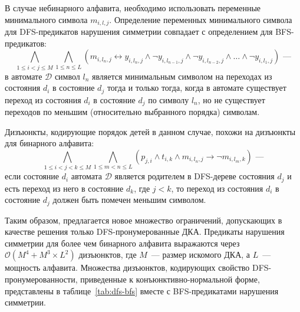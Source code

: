 В случае небинарного алфавита, необходимо использовать переменные минимального символа $m_{i,l,j}$.
Определение переменных минимального символа для DFS-предикатов нарушения симметрии совпадает с определением для BFS-предикатов:
\begin{equation*}
  \bigwedge_{1 \leq i < j \leq M} \bigwedge_{1 \leq n \leq L} \left(m_{i,l_{n},j} \leftrightarrow y_{i,l_{n},j} \wedge \neg y_{i,l_{n - 1}, j} \wedge \neg y_{i,l_{n - 2}, j} \wedge \ldots \wedge \neg y_{i,l_{1},j} \right)\text{~---}
\end{equation*}
в автомате $\mathcal{D}$ символ $l_{n}$ является минимальным символом на переходах из состояния $d_{i}$ в состояние $d_{j}$ тогда и только тогда, когда в автомате существует переход из состояния $d_{i}$ в состояние $d_{j}$ по символу $l_{n}$, но не существует переходов по меньшим (относительно выбранного порядка) символам.

Дизъюнкты, кодирующие порядок детей в данном случае, похожи на дизъюнкты для бинарного алфавита:
\begin{equation*}
  \bigwedge\limits_{1 \leq i < j < k \leq M} \bigwedge_{1 \leq m < n \leq L} \left(p_{j,i} \wedge t_{i,k} \wedge m_{i,l_n,j} \rightarrow \neg m_{i,l_m,k}\right)\text{~---}
\end{equation*}
если состояние $d_{i}$ автомата $\mathcal{D}$ является родителем в DFS-дереве состояния $d_{j}$ и есть переход из него в состояние $d_{k}$, где $j < k$, то переход из состояния $d_{i}$ в состояние $d_{j}$ должен быть помечен меньшим символом. 

Таким образом, предлагается новое множество ограничений, допускающих в качестве решения только DFS-пронумерованные ДКА.
Предикаты нарушения симметрии для более чем бинарного алфавита выражаются через $\mathcal{O}\left(M^4 + M^3 \times L^2\right)$ дизъюнктов, где $M$~--- размер искомого ДКА, а $L$~--- мощность алфавита.
Множества дизъюнктов, кодирующих свойство DFS-пронумерованности, приведенные к конъюнктивно-нормальной форме, представлены в таблице~\ref{tab:dfs-bfs} вместе с BFS-предикатами нарушения симметрии.

